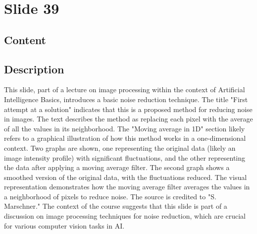 \documentclass{article}%
\begin{document}
%
\newpage%
\section{Slide 39}%
\label{sec:Slide39}%
\subsection{Content}%
%
\subsection{Description}%
This slide, part of a lecture on image processing within the context of Artificial Intelligence Basics, introduces a basic noise reduction technique.  The title "First attempt at a solution" indicates that this is a proposed method for reducing noise in images.  The text describes the method as replacing each pixel with the average of all the values in its neighborhood.  The "Moving average in 1D" section likely refers to a graphical illustration of how this method works in a one-dimensional context.  Two graphs are shown, one representing the original data (likely an image intensity profile) with significant fluctuations, and the other representing the data after applying a moving average filter.  The second graph shows a smoothed version of the original data, with the fluctuations reduced.  The visual representation demonstrates how the moving average filter averages the values in a neighborhood of pixels to reduce noise.  The source is credited to "S. Marschner."  The context of the course suggests that this slide is part of a discussion on image processing techniques for noise reduction, which are crucial for various computer vision tasks in AI.%
\end{document}
